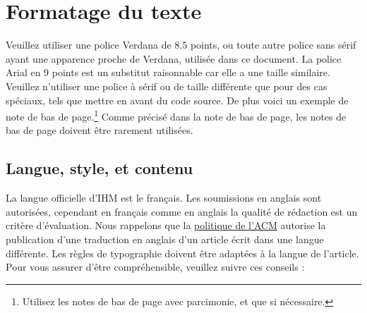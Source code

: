 \documentclass{chi-ext}
\begin{document}
\section{Formatage du texte}
Veuillez utiliser une police Verdana de 8.5 points, ou toute autre police sans sérif ayant une apparence proche de Verdana, utilisée dans ce document.
La police Arial en 9 points est un substitut raisonnable car elle a une taille similaire.
Veuillez n'utiliser une police à sérif ou de taille différente que pour des cas spéciaux, tels que mettre en avant du code source.
De plus voici un exemple de note de bas de page.\footnote{Utilisez les notes de bas de page avec parcimonie, et que si nécessaire.}
Comme précisé dans la note de bas de page, les notes de bas de page doivent être rarement utilisées.

\subsection{Langue, style, et contenu}
La langue officielle d'IHM est le français. Les soumissions en anglais sont autorisées, cependant en français comme en anglais la qualité de rédaction est un critère d'évaluation. Nous rappelons que la \href{http://www.sigchi.org/conferences/organizing-a-sigchi-sponsored-conference}{politique de l'ACM} autorise la publication d'une traduction en anglais d'un article écrit dans une langue différente.
Les règles de typographie doivent être adaptées à la langue de l'article.
Pour vous assurer d'être compréhensible, veuillez suivre ces conseils :
\end{document}
